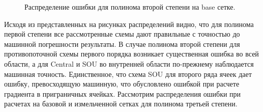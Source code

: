 \begin{figure}[H]
    \centering
    \caption{Распределение ошибки для полинома второй степени на base сетке.}
    \label{fig:19}
\end{figure}
Исходя из представленных на рисунках распределений видно, что для
полинома первой степени все рассмотренные схемы дают правильные с точностью до
машинной погрешности результаты. В случае полинома второй степени для
противопоточной схемы первого порядка возникает существенная ошибка во всей области,
а для Central и SOU во внутренней области по-прежнему наблюдается машинная точность.
Единственное, что схема SOU для второго ряда ячеек дает ошибку, превосходящую
машинную, что обусловлено ошибкой при расчете градиента в приграничных ячейках.
Рассмотрим распределения ошибки при расчетах на базовой и
измельченной сетках для полинома третьей степени.




